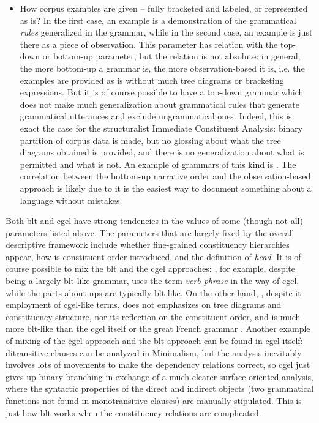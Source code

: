 \documentclass{article}
\newcommand*{\term}[1]{\emph{#1}}
\begin{document}
\begin{itemize}
    \item How corpus examples are given -- fully bracketed and labeled, or represented as is?
    In the first case, 
    an example is a demonstration of the grammatical \term{rules} generalized in the grammar,
    while in the second case,
    an example is just there as a piece of observation.
    This parameter has relation with the top-down or bottom-up parameter,
    but the relation is not absolute:
    in general, the more bottom-up a grammar is, the more observation-based it is, 
    i.e. the examples are provided as is without much tree diagrams or bracketing expressions.
    But it is of course possible to have a top-down grammar 
    which does not make much generalization about grammatical rules 
    that generate grammatical utterances 
    and exclude ungrammatical ones.
    Indeed, this is exact the case for the structuralist Immediate Constituent Analysis:
    binary partition of corpus data is made,
    but no glossing about what the tree diagrams obtained is provided,
    and there is no generalization about what is permitted and what is not.
    An example of grammars of this kind is \citet{chao1965grammar}.
    The correlation between the bottom-up narrative order and the observation-based approach 
    is likely due to it is the easiest way 
    to document something about a language without mistakes.
\end{itemize}

Both \ac{blt} and \ac{cgel} 
have strong tendencies in the values of some (though not all) parameters listed above.
The parameters that are largely fixed by the overall descriptive framework 
include whether fine-grained constituency hierarchies appear,
how is constituent order introduced,
and the definition of \term{head}.
It is of course possible to mix the \ac{blt} and the \ac{cgel} approaches:
\citet{Friesen2017}, for example, despite being a largely \ac{blt}-like grammar,
uses the term \term{verb phrase} in the way of \ac{cgel},
while the parts about \ac{np}s are typically \ac{blt}-like.
On the other hand, \citet{munoz2000gramatica2}, 
despite it employment of \ac{cgel}-like terms,
does not emphasizes on tree diagrams and 
constituency structure, nor its reflection on the constituent order,
and is much more \ac{blt}-like than the \ac{cgel} itself or the great French grammar \citep{abeille2021grande}.
Another example of mixing of the \ac{cgel} approach and the \ac{blt} approach
can be found in \ac{cgel} itself:
ditransitive clauses can be analyzed in Minimalism,
but the analysis inevitably involves lots of movements
to make the dependency relations correct,
so \ac{cgel} just gives up binary branching in exchange of a much clearer surface-oriented analysis,
where the syntactic properties of the direct and indirect objects 
(two grammatical functions not found in monotransitive clauses)
are manually stipulated.
This is just how \ac{blt} works when the constituency relations are complicated.
\end{document}
